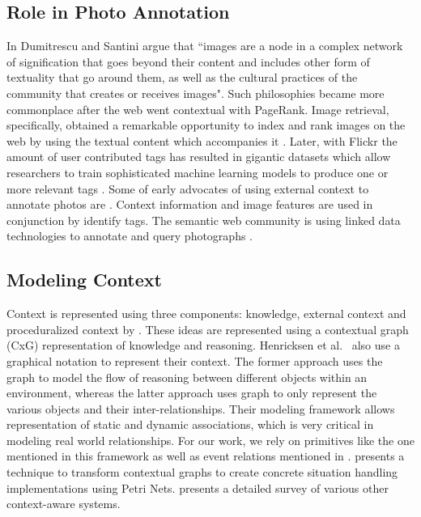 \subsection{Role in Photo Annotation}
In \cite{dumitrescu2009context} Dumitrescu and Santini argue that ``images are a node in a complex network of signification that goes beyond their content and includes other form of textuality that go around them, as well as the cultural practices of the community that creates or receives images". Such philosophies became more commonplace after the web went contextual with PageRank. Image retrieval, specifically, obtained a remarkable opportunity to index and rank images on the web by using the textual content which accompanies it \cite{chen2001web, frankel1996webseer}. Later, with Flickr the amount of user contributed tags has resulted in gigantic datasets which allow researchers to train sophisticated machine learning models to produce one or more relevant tags \cite{brachmann2013feature, li2013geo, liu2013heterogeneous}. Some of early advocates of using external context to annotate photos are \cite{datta2008image, jain2010content}. Context information and image features are used in conjunction by \cite{o2009context, cao2008annotating, boutell2005beyond, cao2008eventscene} identify tags. The semantic web community is using linked data technologies to annotate and query photographs \cite{monaghan2006automating, nowack2006confoto}. 

\subsection{Modeling Context}
Context is represented using three components: knowledge, external context and proceduralized context by \cite{brezillon2003context}. These ideas are represented using a contextual graph (CxG) representation of knowledge and reasoning. Henricksen et al.\ \cite{henricksen2002modeling} also use a graphical notation to represent their context. The former approach uses the graph to model the flow of reasoning between different objects within an environment, whereas the latter approach uses graph to only represent the various objects and their inter-relationships. Their modeling framework allows representation of static and dynamic associations, which is very critical in modeling real world relationships. For our work, we rely on primitives like the one mentioned in this framework as well as event relations mentioned in \cite{gupta2011managing}. \cite{reignier2007context} presents a technique to transform contextual graphs to create concrete situation handling implementations using Petri Nets. \cite{hong2009context} presents a detailed survey of various other context-aware systems.

